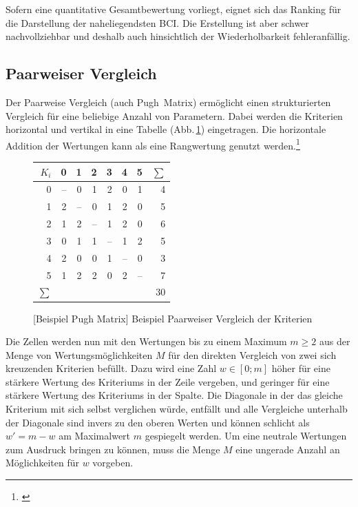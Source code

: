 Sofern eine quantitative Gesamtbewertung vorliegt, eignet sich das Ranking für die Darstellung der naheliegendsten \gls{BCI}.
Die Erstellung ist aber schwer nachvollziehbar und deshalb auch hinsichtlich der Wiederholbarkeit fehleranfällig.

\subsection{Paarweiser Vergleich}\label{dep:pugh}

Der Paarweise Vergleich (auch Pugh~Matrix) ermöglicht einen strukturierten Vergleich für eine beliebige Anzahl von Parametern.
Dabei werden die Kriterien horizontal und vertikal in eine Tabelle (Abb.\,\ref{abb:pugh-matrix}) eingetragen.
Die horizontale Addition der Wertungen kann als eine Rangwertung genutzt werden.\footnote{\cite{TN_libero_mab21000123709}}

\begin{figure}[!htp]
\centering
\begin{tabular}{|r||r|r|r|r|r|r||r|}
\hline
\(K_i\)	& 0 	& 1 	& 2 	& 3 	& 4 	& 5	& \(\sum{}\)\\
\hline \hline
0		& --	& 0		& 1		& 2		& 0		& 1	& 4			\\
\hline
1		& 2		& --	& 0		& 1		& 2		& 0	& 5			\\
\hline
2		& 1		& 2		& --	& 1		& 2		& 0	& 6			\\
\hline
3		& 0		& 1		& 1		& --	& 1		& 2	& 5			\\
\hline
4		& 2		& 0		& 0		& 1		& --	& 0	& 3			\\
\hline
5		& 1		& 2		& 2		& 0		& 2		& --& 7			\\
\hline \hline
\(\sum{}\) & \multicolumn{6}{r||}{} & {30} \\
\hline
\end{tabular}
[Beispiel Pugh Matrix]{\label{abb:pugh-matrix} Beispiel Paarweiser Vergleich der Kriterien}
\end{figure}

Die Zellen werden nun mit den Wertungen bis zu einem Maximum \(m \ge 2\) aus der Menge von Wertungsmöglichkeiten \(M\) für den direkten Vergleich von zwei sich kreuzenden Kriterien befüllt.
Dazu wird eine Zahl \(w \in [0;m] \)  höher für eine stärkere Wertung des Kriteriums in der Zeile vergeben, und geringer für eine stärkere Wertung des Kriteriums in der Spalte.
Die Diagonale in der das gleiche Kriterium mit sich selbst verglichen würde, entfällt und alle Vergleiche unterhalb der Diagonale sind invers zu den oberen Werten und können schlicht als \(w' = m - w\) am Maximalwert \(m\) gespiegelt werden.
Um eine neutrale Wertungen zum Ausdruck bringen zu können, muss die Menge \(M\) eine ungerade Anzahl an Möglichkeiten für \(w\) vorgeben.

